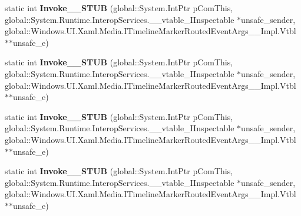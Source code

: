 \begin{DoxyCompactItemize}
\item 
\mbox{\label{struct_windows_1_1_u_i_1_1_xaml_1_1_media_1_1_timeline_marker_routed_event_handler_____impl_1_1_vtbl_a3402b7d67c9165005ca84070a144112d}} 
static int {\bfseries Invoke\+\_\+\+\_\+\+S\+T\+UB} (global\+::\+System.\+Int\+Ptr p\+Com\+This, global\+::\+System.\+Runtime.\+Interop\+Services.\+\_\+\+\_\+vtable\+\_\+\+I\+Inspectable $\ast$unsafe\+\_\+sender, global\+::\+Windows.\+U\+I.\+Xaml.\+Media.\+I\+Timeline\+Marker\+Routed\+Event\+Args\+\_\+\+\_\+\+Impl.\+Vtbl $\ast$$\ast$unsafe\+\_\+e)
\item 
\mbox{\label{struct_windows_1_1_u_i_1_1_xaml_1_1_media_1_1_timeline_marker_routed_event_handler_____impl_1_1_vtbl_a3402b7d67c9165005ca84070a144112d}} 
static int {\bfseries Invoke\+\_\+\+\_\+\+S\+T\+UB} (global\+::\+System.\+Int\+Ptr p\+Com\+This, global\+::\+System.\+Runtime.\+Interop\+Services.\+\_\+\+\_\+vtable\+\_\+\+I\+Inspectable $\ast$unsafe\+\_\+sender, global\+::\+Windows.\+U\+I.\+Xaml.\+Media.\+I\+Timeline\+Marker\+Routed\+Event\+Args\+\_\+\+\_\+\+Impl.\+Vtbl $\ast$$\ast$unsafe\+\_\+e)
\item 
\mbox{\label{struct_windows_1_1_u_i_1_1_xaml_1_1_media_1_1_timeline_marker_routed_event_handler_____impl_1_1_vtbl_a3402b7d67c9165005ca84070a144112d}} 
static int {\bfseries Invoke\+\_\+\+\_\+\+S\+T\+UB} (global\+::\+System.\+Int\+Ptr p\+Com\+This, global\+::\+System.\+Runtime.\+Interop\+Services.\+\_\+\+\_\+vtable\+\_\+\+I\+Inspectable $\ast$unsafe\+\_\+sender, global\+::\+Windows.\+U\+I.\+Xaml.\+Media.\+I\+Timeline\+Marker\+Routed\+Event\+Args\+\_\+\+\_\+\+Impl.\+Vtbl $\ast$$\ast$unsafe\+\_\+e)
\item 
\mbox{\label{struct_windows_1_1_u_i_1_1_xaml_1_1_media_1_1_timeline_marker_routed_event_handler_____impl_1_1_vtbl_a3402b7d67c9165005ca84070a144112d}} 
static int {\bfseries Invoke\+\_\+\+\_\+\+S\+T\+UB} (global\+::\+System.\+Int\+Ptr p\+Com\+This, global\+::\+System.\+Runtime.\+Interop\+Services.\+\_\+\+\_\+vtable\+\_\+\+I\+Inspectable $\ast$unsafe\+\_\+sender, global\+::\+Windows.\+U\+I.\+Xaml.\+Media.\+I\+Timeline\+Marker\+Routed\+Event\+Args\+\_\+\+\_\+\+Impl.\+Vtbl $\ast$$\ast$unsafe\+\_\+e)

\end{DoxyCompactItemize}
